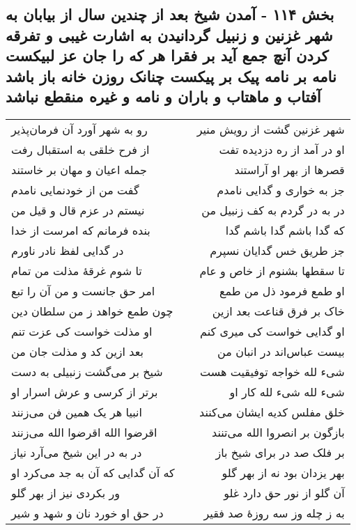 \begin{center}
\section*{بخش ۱۱۴ - آمدن شیخ بعد از چندین سال از بیابان به شهر غزنین و  زنبیل گردانیدن به اشارت غیبی و تفرقه کردن آنچ جمع آید بر فقرا  هر که را جان عز لبیکست  نامه بر نامه پیک بر پیکست  چنانک روزن خانه باز باشد آفتاب و ماهتاب و باران و نامه و غیره  منقطع نباشد}
\label{sec:sh114}
\begin{longtable}{l p{0.5cm} r}
رو به شهر آورد آن فرمان‌پذیر
&&
شهر غزنین گشت از رویش منیر
\\
از فرح خلقی به استقبال رفت
&&
او در آمد از ره دزدیده تفت
\\
جمله اعیان و مهان بر خاستند
&&
قصرها از بهر او آراستند
\\
گفت من از خودنمایی نامدم
&&
جز به خواری و گدایی نامدم
\\
نیستم در عزم قال و قیل من
&&
در به در گردم به کف زنبیل من
\\
بنده فرمانم که امرست از خدا
&&
که گدا باشم گدا باشم گدا
\\
در گدایی لفظ نادر ناورم
&&
جز طریق خس گدایان نسپرم
\\
تا شوم غرقهٔ مذلت من تمام
&&
تا سقطها بشنوم از خاص و عام
\\
امر حق جانست و من آن را تبع
&&
او طمع فرمود ذل من طمع
\\
چون طمع خواهد ز من سلطان دین
&&
خاک بر فرق قناعت بعد ازین
\\
او مذلت خواست کی عزت تنم
&&
او گدایی خواست کی میری کنم
\\
بعد ازین کد و مذلت جان من
&&
بیست عباس‌اند در انبان من
\\
شیخ بر می‌گشت زنبیلی به دست
&&
شیء لله خواجه توفیقیت هست
\\
برتر از کرسی و عرش اسرار او
&&
شیء لله شیء لله کار او
\\
انبیا هر یک همین فن می‌زنند
&&
خلق مفلس کدیه ایشان می‌کنند
\\
اقرضوا الله اقرضوا الله می‌زنند
&&
بازگون بر انصروا الله می‌تنند
\\
در به در این شیخ می‌آرد نیاز
&&
بر فلک صد در برای شیخ باز
\\
که آن گدایی که آن به جد می‌کرد او
&&
بهر یزدان بود نه از بهر گلو
\\
ور بکردی نیز از بهر گلو
&&
آن گلو از نور حق دارد غلو
\\
در حق او خورد نان و شهد و شیر
&&
به ز چله وز سه روزهٔ صد فقیر
\\

\end{longtable}
\end{center}
